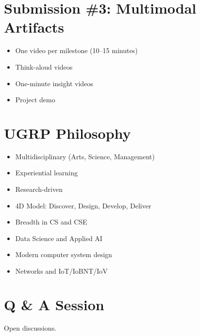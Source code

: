 \documentclass[12pt]{article}
\begin{document}
\section*{Submission \#3: Multimodal Artifacts}

\begin{itemize}
\item One video per milestone (10--15 minutes)
\item Think-aloud videos
\item One-minute insight videos
\item Project demo
\end{itemize}

\section*{UGRP Philosophy}

\begin{itemize}
\item Multidisciplinary (Arts, Science, Management)
\item Experiential learning
\item Research-driven
\item 4D Model: Discover, Design, Develop, Deliver
\item Breadth in CS and CSE
\item Data Science and Applied AI
\item Modern computer system design
\item Networks and IoT/IoBNT/IoV
\end{itemize}

\section*{Q \& A Session}

Open discussions.
\end{document}
